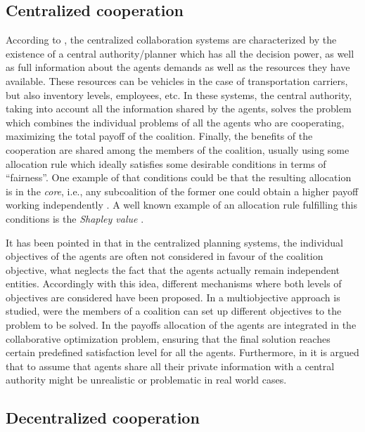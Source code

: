 \documentclass{article}
\begin{document}
\subsection{Centralized cooperation}

According to \textcite{GANSTERER2017}, the centralized collaboration systems are characterized by the existence of a central authority/planner which has all the decision power, as well as full information about the agents demands as well as the resources they have available. These resources can be vehicles in the case of transportation carriers, but also inventory levels, employees, etc. In these systems, the central authority, taking into account all the information shared by the agents, solves the problem which combines the individual problems of all the agents who are cooperating,  maximizing the total payoff of the coalition. Finally, the benefits of the cooperation are shared among the members of the coalition, usually using some allocation rule which ideally satisfies some desirable conditions in terms of ``fairness''. One example of that conditions could be that the resulting allocation is in the \emph{core}, i.e., any subcoalition of the former one could obtain a higher payoff working
independently \parencite{GONZALEZ2010}. A well known example of an allocation rule fulfilling this conditions is the \emph{Shapley value} \parencite{SHAPLEY1952}.

It has been pointed in \textcite{DEFRYN2018891} that in the centralized planning systems, the individual objectives
of the agents are often not considered in favour of the coalition objective, what neglects the fact that the agents actually remain independent entities.  Accordingly with this idea, different mechanisms where both levels of objectives are
considered have been proposed. In \textcite{DEFRYN20191} a multiobjective approach is studied, were the members of a coalition can set up different objectives to the problem to be solved. In \textcite{VANOVERMEIRE2014125} the payoffs allocation of the agents are integrated in the collaborative optimization problem, ensuring that the final solution reaches certain predefined satisfaction level for all the agents. Furthermore, in \textcite{SERRANO2017}  it is argued that to assume that agents share all their private information with a central authority might be unrealistic or problematic in real world cases.


\subsection{Decentralized cooperation}
\end{document}

